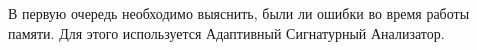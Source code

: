 В первую очередь необходимо выяснить, были ли ошибки во время работы памяти. Для этого используется Адаптивный Сигнатурный Анализатор. 



